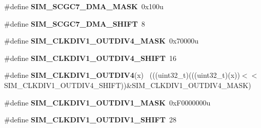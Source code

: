 \begin{DoxyCompactItemize}
\item 
\hypertarget{group___s_i_m___register___masks_gac559e129885604991932101719e3b368}{}\#define {\bfseries S\+I\+M\+\_\+\+S\+C\+G\+C7\+\_\+\+D\+M\+A\+\_\+\+M\+A\+S\+K}~0x100u\label{group___s_i_m___register___masks_gac559e129885604991932101719e3b368}

\item 
\hypertarget{group___s_i_m___register___masks_ga1113f1622eb2e4099653e93943a89c6e}{}\#define {\bfseries S\+I\+M\+\_\+\+S\+C\+G\+C7\+\_\+\+D\+M\+A\+\_\+\+S\+H\+I\+F\+T}~8\label{group___s_i_m___register___masks_ga1113f1622eb2e4099653e93943a89c6e}

\item 
\hypertarget{group___s_i_m___register___masks_gaa2a972171bb5a662e1b4993b042f7180}{}\#define {\bfseries S\+I\+M\+\_\+\+C\+L\+K\+D\+I\+V1\+\_\+\+O\+U\+T\+D\+I\+V4\+\_\+\+M\+A\+S\+K}~0x70000u\label{group___s_i_m___register___masks_gaa2a972171bb5a662e1b4993b042f7180}

\item 
\hypertarget{group___s_i_m___register___masks_ga053a7a1ffc9f3b6834679c63ca0ebe29}{}\#define {\bfseries S\+I\+M\+\_\+\+C\+L\+K\+D\+I\+V1\+\_\+\+O\+U\+T\+D\+I\+V4\+\_\+\+S\+H\+I\+F\+T}~16\label{group___s_i_m___register___masks_ga053a7a1ffc9f3b6834679c63ca0ebe29}

\item 
\hypertarget{group___s_i_m___register___masks_ga1c33604ada20447d39b21e0f39c9dcd0}{}\#define {\bfseries S\+I\+M\+\_\+\+C\+L\+K\+D\+I\+V1\+\_\+\+O\+U\+T\+D\+I\+V4}(x)                                  ~(((uint32\+\_\+t)(((uint32\+\_\+t)(x))$<$$<$S\+I\+M\+\_\+\+C\+L\+K\+D\+I\+V1\+\_\+\+O\+U\+T\+D\+I\+V4\+\_\+\+S\+H\+I\+F\+T))\&S\+I\+M\+\_\+\+C\+L\+K\+D\+I\+V1\+\_\+\+O\+U\+T\+D\+I\+V4\+\_\+\+M\+A\+S\+K)\label{group___s_i_m___register___masks_ga1c33604ada20447d39b21e0f39c9dcd0}

\item 
\hypertarget{group___s_i_m___register___masks_ga1bd42e75000e91999a7d8c2f94a9b606}{}\#define {\bfseries S\+I\+M\+\_\+\+C\+L\+K\+D\+I\+V1\+\_\+\+O\+U\+T\+D\+I\+V1\+\_\+\+M\+A\+S\+K}~0x\+F0000000u\label{group___s_i_m___register___masks_ga1bd42e75000e91999a7d8c2f94a9b606}

\item 
\hypertarget{group___s_i_m___register___masks_ga2d45b701595bf4f2bc6a451508f94c25}{}\#define {\bfseries S\+I\+M\+\_\+\+C\+L\+K\+D\+I\+V1\+\_\+\+O\+U\+T\+D\+I\+V1\+\_\+\+S\+H\+I\+F\+T}~28\label{group___s_i_m___register___masks_ga2d45b701595bf4f2bc6a451508f94c25}


\end{DoxyCompactItemize}
